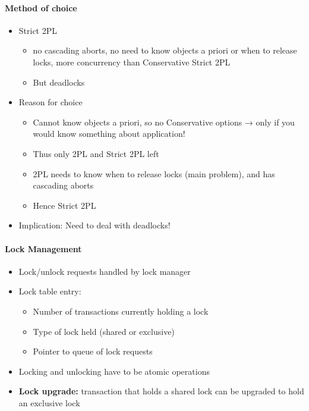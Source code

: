 \paragraph{Method of choice}
\begin{itemize}
\item Strict 2PL
  \begin{itemize}
  \item no cascading aborts, no need to know objects a priori or
    when to release locks, more concurrency than Conservative
    Strict 2PL
  \item But deadlocks
  \end{itemize}

\item Reason for choice
  \begin{itemize}
  \item Cannot know objects a priori, so no Conservative options
    → only if you would know something about application!
  \item Thus only 2PL and Strict 2PL left
  \item 2PL needs to know when to release locks (main problem),
    and has cascading aborts
  \item Hence Strict 2PL
  \end{itemize}

\item Implication: Need to deal with deadlocks!
\end{itemize}


\paragraph{Lock Management}
\begin{itemize}
\item Lock/unlock requests handled by lock manager

\item Lock table entry:
  \begin{itemize}
  \item Number of transactions currently holding a lock
  \item Type of lock held (shared or exclusive)
  \item Pointer to queue of lock requests
  \end{itemize}

\item Locking and unlocking have to be atomic operations

\item \textbf{Lock upgrade:} transaction that holds a shared lock
  can be upgraded to hold an exclusive lock
\end{itemize}


